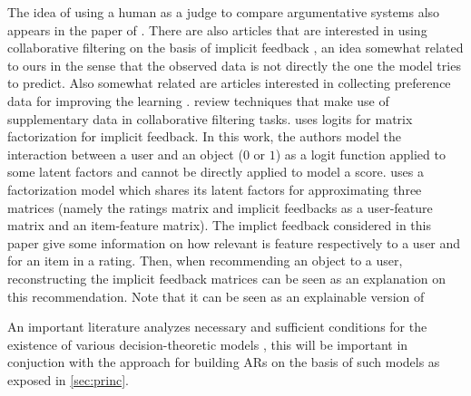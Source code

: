 \documentclass[version=3.21, pagesize, twoside=off, bibliography=totoc, DIV=calc, fontsize=12pt, a4paper, french, english]{scrartcl}
\begin{document}
The idea of using a human as a judge to compare argumentative systems also appears in the paper of \citet{irving_ai_2018}.
There are also articles that are interested in using collaborative filtering on the basis of implicit feedback \citep{rendle_bpr:_2009, hu_collaborative_2008}, an idea somewhat related to ours in the sense that the observed data is not directly the one the model tries to predict.
Also somewhat related are articles interested in collecting preference data for improving the learning \citep{sepliarskaia_preference_2018}. \citet{chen_attribute-aware_2018} review techniques that make use of supplementary data in collaborative filtering tasks.
\citet{johnson_logistic_2014} uses logits for matrix factorization for implicit feedback. In this work, the authors model the interaction between a user and an object ($0$ or $1$) as a logit function applied to some latent factors and cannot be directly applied to model a score. \citet{zhang_explicit_2014} uses a factorization model which shares its latent factors for approximating three matrices (namely the ratings matrix and implicit feedbacks as a user-feature matrix and an item-feature matrix). The implict feedback considered in this paper give some information on how relevant is feature respectively to a user and for an item in a rating. Then, when recommending an object to a user, reconstructing the implicit feedback matrices can be seen as an explanation on this recommendation. Note that it can be seen as an explainable version of 

An important literature analyzes necessary and sufficient conditions for the existence of various decision-theoretic models \citep{krantz_foundations_1971, gonzales_additive_1996, bouyssou_consolidated_2015}, this will be important in conjuction with the approach for building \acp{AR} on the basis of such models as exposed in \cref{sec:princ}.

\end{document}
